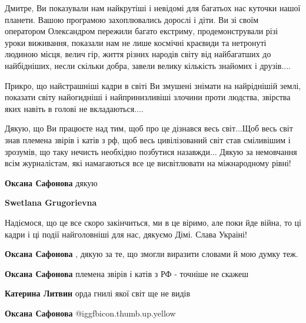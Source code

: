  
 
 
 
 
\zzSecCmt

\begin{itemize} %

Дмитре, Ви показували нам найкрутіші і невідомі для багатьох нас куточки нашої
планети. Вашою програмою захоплювались дорослі і діти. Ви зі своїм оператором
Олександром пережили багато екстриму, продемонстрували різі уроки виживання,
показали нам не лише космічні краєвиди та нетронуті людиною місця, велич гір,
життя різних народів світу від найбагатших до найбідніших, несли скільки добра,
завели велику кількість знайомих і друзів....

Прикро, що найстрашніші кадри в світі Ви змушені знімати на найріднішій землі,
показати світу найогидніші і найпринизливіші злочини проти людства, звірства
яких навіть в голові не вкладаються....

Дякую, що Ви працюєте над тим, щоб про це дізнався весь світ...Щоб весь світ
знав племена звірів і катів з рф, щоб весь цивілізований світ став сміливішим і
зрозумів, що таку нечисть необхідно позбутися назавжди... Дякую за немовчання
всім журналістам, які намагаються все це висвітлювати на міжнародному рівні!

\begin{itemize} %
\textbf{Оксана Сафонова} дякую

\textbf{Swetlana Grugorievna} 

Надіємося, що це все скоро закінчиться, ми в це віримо, але поки йде війна, то ці
кадри і ці події найголовніші для нас, дякуємо Дімі. Слава Украіні!

\textbf{Оксана Сафонова} , дякую за те, що змогли виразити словами й мою думку теж.

\textbf{Оксана Сафонова} племена звірів і катів з РФ - точніше не скажеш

\textbf{Катерина Литвин} орда гнилі якої світ ще не видів

\textbf{Оксана Сафонова} @igg{fbicon.thumb.up.yellow} 


\end{itemize}
\end{itemize}
